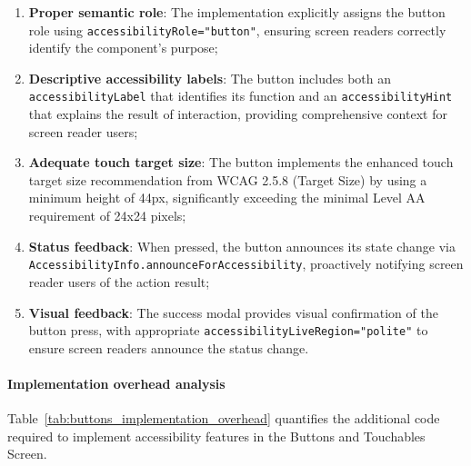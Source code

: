 \begin{enumerate}
    \item \textbf{Proper semantic role}: The implementation explicitly assigns the button role using \texttt{accessibilityRole="button"}, ensuring screen readers correctly identify the component's purpose;
    
    \item \textbf{Descriptive accessibility labels}: The button includes both an \texttt{accessibilityLabel} that identifies its function and an \texttt{accessibilityHint} that explains the result of interaction, providing comprehensive context for screen reader users;
    
    \item \textbf{Adequate touch target size}: The button implements the enhanced touch target size recommendation from WCAG 2.5.8 (Target Size) by using a minimum height of 44px, significantly exceeding the minimal Level AA requirement of 24x24 pixels;
    
    \item \textbf{Status feedback}: When pressed, the button announces its state change via \texttt{AccessibilityInfo.announceForAccessibility}, proactively notifying screen reader users of the action result;
    
    \item \textbf{Visual feedback}: The success modal provides visual confirmation of the button press, with appropriate \texttt{accessibilityLiveRegion="polite"} to ensure screen readers announce the status change.
\end{enumerate}

\paragraph{Implementation overhead analysis}

Table~\ref{tab:buttons_implementation_overhead} quantifies the additional code required to implement accessibility features in the Buttons and Touchables Screen.

